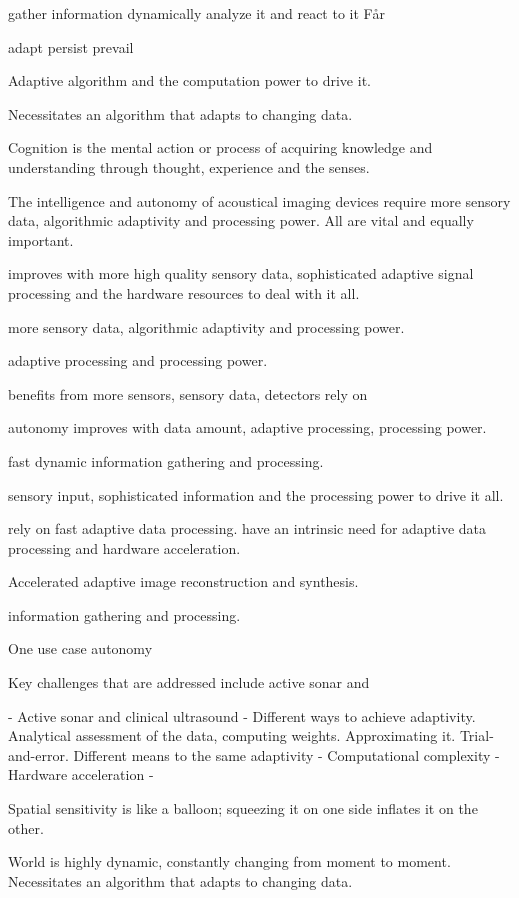 gather information
dynamically analyze it
and react to it
Får 

adapt
persist
prevail

Adaptive algorithm and the computation power to drive it.


Necessitates an algorithm that adapts to changing data. 



Cognition is the mental action or process of acquiring knowledge and understanding through thought, experience and the senses. 

The intelligence and autonomy of acoustical imaging devices require more sensory data, algorithmic adaptivity and processing power. All are vital and equally important. 



improves with more high quality sensory data, sophisticated adaptive signal processing and the hardware resources to deal with it all. 

more sensory data, algorithmic adaptivity and processing power.

adaptive processing and processing power. 

benefits from more sensors, sensory data,   detectors rely on 

autonomy improves with data amount, adaptive processing, processing power.

fast dynamic information gathering and processing. 


sensory input, sophisticated information and the processing power to drive it all. 

rely on fast adaptive data processing. have an intrinsic need for adaptive data processing and hardware acceleration. 

Accelerated adaptive image reconstruction and synthesis. 

information gathering and processing. 

One use case autonomy

Key challenges that are addressed include active sonar and

- Active sonar and clinical ultrasound
- Different ways to achieve adaptivity. Analytical assessment of the data, computing weights. Approximating it. Trial-and-error. Different means to the same adaptivity
- Computational complexity
- Hardware acceleration
- 

Spatial sensitivity is like a balloon; squeezing it on one side inflates it on the other. 

World is highly dynamic, constantly changing from moment to moment. Necessitates an algorithm that adapts to changing data. 



